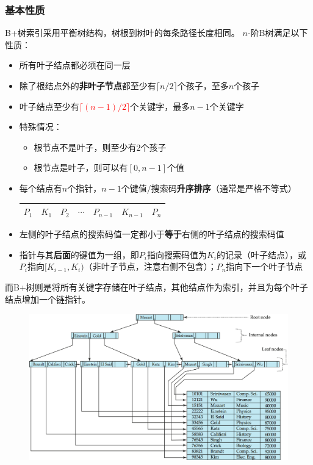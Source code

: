 \subsubsection{基本性质}
B+树索引采用平衡树结构，树根到树叶的每条路径长度相同。
$n$-阶B树满足以下性质：
\begin{itemize}
	\item 所有叶子结点都必须在同一层
	\item 除了根结点外的\textbf{非叶子节点}都至少有$\lceil n/2\rceil$个孩子，至多$n$个孩子
	\item 叶子结点至少有\textcolor{red}{$\lceil (n-1)/2\rceil$}个关键字，最多$n-1$个关键字
	\item 特殊情况：
	\begin{itemize}
		\item 根节点不是叶子，则至少有$2$个孩子
		\item 根节点是叶子，则可以有$[0,n-1]$个值
	\end{itemize}
	\item 每个结点有$n$个指针，$n-1$个键值/搜索码\textbf{升序排序}（通常是严格不等式）
	\begin{center}
	\begin{tabular}{|c|c|c|c|c|c|c|}\hline
	$P_1$ & $K_1$ & $P_2$ & $\cdots$ & $P_{n-1}$ & $K_{n-1}$ & $P_n$\\\hline
	\end{tabular}
	\end{center}
	\item 左侧的叶子结点的搜索码值一定都小于\textbf{等于}右侧的叶子结点的搜索码值
	\item 指针与其\textbf{后面}的键值为一组，即$P_i$指向搜索码值为$K_i$的记录（叶子结点），或$P_i$指向$[K_{i-1},K_i)$（非叶子节点，注意右侧不包含）；$P_n$指向下一个叶子节点
\end{itemize}

而B+树则是将所有关键字存储在叶子结点，其他结点作为索引，并且为每个叶子结点增加一个链指针。
\begin{figure}[H]
\centering
\includegraphics[width=0.6\linewidth]{fig/bp-tree.png}
\end{figure}

